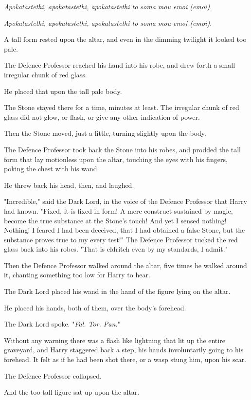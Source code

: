 \emph{Apokatastethi, apokatastethi, apokatastethi to soma mou emoi (emoi).}

\emph{Apokatastethi, apokatastethi, apokatastethi to soma mou emoi (emoi).}

A tall form rested upon the altar, and even in the dimming twilight it looked
too pale.

The Defence Professor reached his hand into his robe, and drew forth a small
irregular chunk of red glass.

He placed that upon the tall pale body.

The Stone stayed there for a time, minutes at least. The irregular chunk of red
glass did not glow, or flash, or give any other indication of power.

Then the Stone moved, just a little, turning slightly upon the body.

The Defence Professor took back the Stone into his robes, and prodded the tall
form that lay motionless upon the altar, touching the eyes with his fingers,
poking the chest with his wand.

He threw back his head, then, and laughed.

"Incredible," said the Dark Lord, in the voice of the Defence Professor that
Harry had known. "Fixed, it is fixed in form! A mere construct sustained by
magic, become the true substance at the Stone's touch! And yet I sensed
nothing! Nothing! I feared I had been deceived, that I had obtained a false
Stone, but the substance proves true to my every test!" The Defence Professor
tucked the red glass back into his robes. "That is eldritch even by my
standards, I admit."

Then the Defence Professor walked around the altar, five times he walked around
it, chanting something too low for Harry to hear.

The Dark Lord placed his wand in the hand of the figure lying on the altar.

He placed his hands, both of them, over the body's forehead.

The Dark Lord spoke. "\emph{Fal. Tor. Pan.}"

Without any warning there was a flash like lightning that lit up the entire
graveyard, and Harry staggered back a step, his hands involuntarily going to
his forehead. It felt as if he had been shot there, or a wasp stung him, upon
his scar.

The Defence Professor collapsed.

And the too-tall figure sat up upon the altar.

